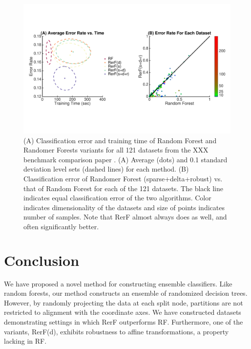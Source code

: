 \documentclass{article} %
\begin{document}
\begin{figure}[h]
\begin{center}
\includegraphics[trim=0in 2.3in 0in 2.3in, clip=true, width=\linewidth]{../Figures/pdf/Fig4}
\end{center}
\caption{(A) Classification error and training time of Random Forest and Randomer Forests variants for all 121 datasets from the XXX benchmark comparison paper \cite{???}. (A) Average (dots) and 0.1 standard deviation level sets (dashed lines) for each method. (B) Classification error of Randomer Forest (sparse+delta+robust) vs. that of Random Forest for each of the 121 datasets. The black line indicates equal classification error of the two algorithms. Color indicates dimensionality of the datasets and size of points indicates number of samples. Note that RerF almost always does as well, and often significantly better.}
\label{fig:benchmark}
\end{figure}

\section{Conclusion}

We have proposed a novel method for constructing ensemble classifiers. Like random forests, our method constructs an ensemble of randomized decision trees. However, by randomly projecting the data at each split node, partitions are not restricted to alignment with the coordinate axes. We have constructed datasets demonstrating settings in which RerF outperforms RF. Furthermore, one of the variants, RerF(d), exhibits robustness to affine transformations, a property lacking in RF.
\end{document}
